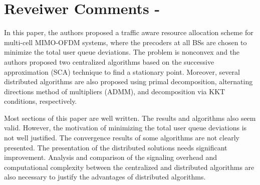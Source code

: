 
\section*{Reveiwer Comments - }

In this paper, the authors proposed a traffic aware resource allocation scheme for multi-cell MIMO-OFDM systems, where the precoders at all BSs are chosen to minimize the total user queue deviations. The problem is nonconvex and the authors proposed two centralized algorithms based on the successive approximation (SCA) technique to find a stationary point. Moreover, several distributed algorithms are also proposed using primal decomposition, alternating directions method of multipliers (ADMM), and decomposition via KKT conditions, respectively.

Most sections of this paper are well written. The results and algorithms also seem valid. However, the motivation of minimizing the total user queue deviations is not well justified. The convergence results of some algorithms are not clearly presented. The presentation of the distributed solutions needs significant improvement. Analysis and comparison of the signaling overhead and computational complexity between the centralized and distributed algorithms are also necessary to justify the advantages of distributed algorithms.


